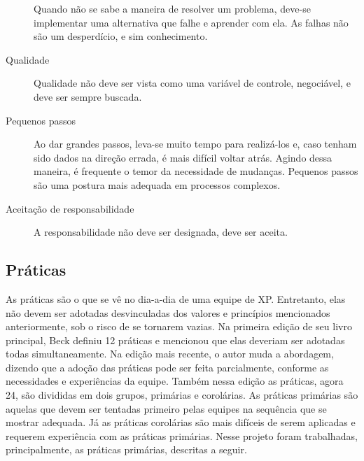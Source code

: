 \begin{description}
        Quando não se sabe a maneira de resolver um problema, deve-se implementar uma alternativa que falhe e aprender com ela. As falhas não são um desperdício, e sim conhecimento.
      \item[Qualidade]
        Qualidade não deve ser vista como uma variável de controle, negociável, e deve ser sempre buscada.
      \item[Pequenos passos]
        Ao dar grandes passos, leva-se muito tempo para realizá-los e, caso tenham sido dados na direção errada, é mais difícil voltar atrás. Agindo dessa maneira, é frequente o temor da necessidade de mudanças. Pequenos passos são uma postura mais adequada em processos complexos.
      \item[Aceitação de responsabilidade]
        A responsabilidade não deve ser designada, deve ser aceita.
    \end{description}

  \subsection{Práticas}
    As práticas são o que se vê no dia-a-dia de uma equipe de XP. Entretanto, elas não devem ser adotadas desvinculadas dos valores e princípios mencionados anteriormente, sob o risco de se tornarem vazias. Na primeira edição de seu livro principal, Beck definiu 12 práticas e mencionou que elas deveriam ser adotadas todas simultaneamente. Na edição mais recente, o autor muda a abordagem, dizendo que a adoção das práticas pode ser feita parcialmente, conforme as necessidades e experiências da equipe. Também nessa edição as práticas, agora 24, são divididas em dois grupos, primárias e corolárias. As práticas primárias são aquelas que devem ser tentadas primeiro pelas equipes na sequência que se mostrar adequada. Já as práticas corolárias são mais difíceis de serem aplicadas e requerem experiência com as práticas primárias. Nesse projeto foram trabalhadas, principalmente, as práticas primárias, descritas a seguir.

